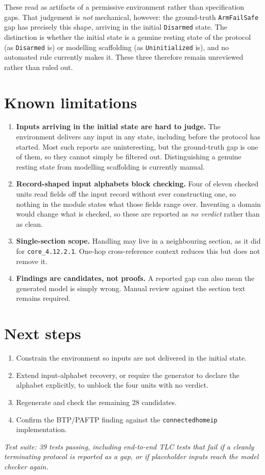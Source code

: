 \documentclass[11pt,a4paper]{article}
\begin{document}
These read as artifacts of a permissive environment rather than specification gaps.
That judgement is \emph{not} mechanical, however: the ground-truth
\texttt{ArmFailSafe} gap has precisely this shape, arriving in the initial
\texttt{Disarmed} state. The distinction is whether the initial state is a genuine
resting state of the protocol (as \texttt{Disarmed} is) or modelling scaffolding
(as \texttt{Uninitialized} is), and no automated rule currently makes it. These
three therefore remain unreviewed rather than ruled out.

\section{Known limitations}

\begin{enumerate}
  \item \textbf{Inputs arriving in the initial state are hard to judge.} The
    environment delivers any input in any state, including before the protocol has
    started. Most such reports are uninteresting, but the ground-truth gap is one
    of them, so they cannot simply be filtered out. Distinguishing a genuine
    resting state from modelling scaffolding is currently manual.

  \item \textbf{Record-shaped input alphabets block checking.} Four of eleven
    checked units read fields off the input record without ever constructing one, so
    nothing in the module states what those fields range over. Inventing a domain
    would change what is checked, so these are reported as \emph{no verdict} rather
    than as clean.

  \item \textbf{Single-section scope.} Handling may live in a neighbouring section,
    as it did for \texttt{core\_4.12.2.1}. One-hop cross-reference context reduces
    this but does not remove it.

  \item \textbf{Findings are candidates, not proofs.} A reported gap can also mean
    the generated model is simply wrong. Manual review against the section text
    remains required.
\end{enumerate}

\section{Next steps}

\begin{enumerate}
  \item Constrain the environment so inputs are not delivered in the initial state.
  \item Extend input-alphabet recovery, or require the generator to declare the
    alphabet explicitly, to unblock the four units with no verdict.
  \item Regenerate and check the remaining 28 candidates.
  \item Confirm the BTP/PAFTP finding against the \texttt{connectedhomeip}
    implementation.
\end{enumerate}

\vspace{1em}
\noindent\textit{Test suite: 39 tests passing, including end-to-end TLC tests that
fail if a cleanly terminating protocol is reported as a gap, or if placeholder inputs
reach the model checker again.}
\end{document}
